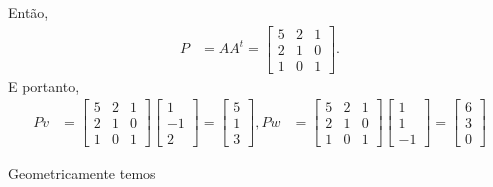 \begin{questions}
\begin{parts}
\begin{solution}
            Ent\~{a}o,
            \begin{align*}
                P &= A A^t = \begin{bmatrix}
                    5 & 2 & 1 \\
                    2 & 1 & 0 \\
                    1 & 0 & 1
                \end{bmatrix}.
            \end{align*}
            E portanto,
            \begin{align*}
                P v &= \begin{bmatrix}
                    5 & 2 & 1 \\
                    2 & 1 & 0 \\
                    1 & 0 & 1
                \end{bmatrix} \begin{bmatrix}
                    1 \\
                    -1 \\
                    2
                \end{bmatrix} = \begin{bmatrix}
                    5 \\
                    1 \\
                    3
                \end{bmatrix},
                P w &= \begin{bmatrix}
                    5 & 2 & 1 \\
                    2 & 1 & 0 \\
                    1 & 0 & 1
                \end{bmatrix} \begin{bmatrix}
                    1 \\
                    1 \\
                    -1
                \end{bmatrix} = \begin{bmatrix}
                    6 \\
                    3 \\
                    0
                \end{bmatrix}
            \end{align*}

            Geometricamente temos
            \begin{center}
\end{center}
\end{solution}
\end{parts}
\end{questions}
